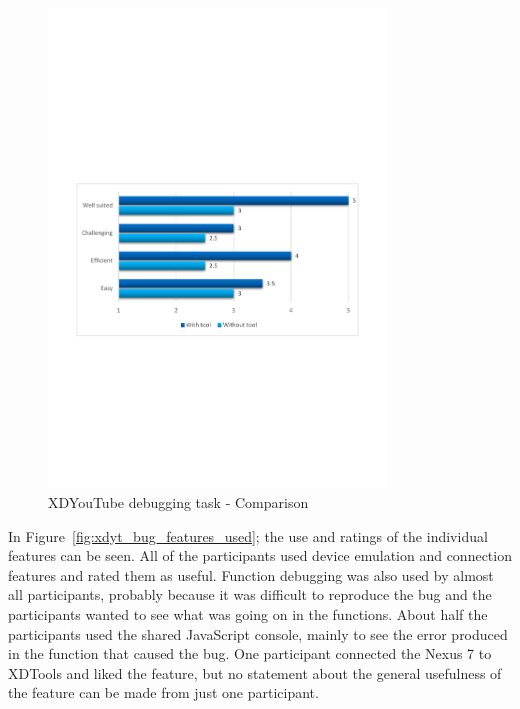 \begin{figure}[H]
  \centering
    \includegraphics[width=0.8\textwidth]{images/charts/xdyt_bug_comparison.pdf}
	\caption[xdyt-bug: Comparison]{XDYouTube debugging task - Comparison}
	\label{fig:xdyt_bug_comparison}
\end{figure}

In Figure~\ref{fig:xdyt_bug_features_used}; the use and ratings of the individual features can be seen. All of the participants used device emulation and connection features and rated them as useful. Function debugging was also used by almost all participants, probably because it was difficult to reproduce the bug and the participants wanted to see what was going on in the functions. About half the participants used the shared JavaScript console, mainly to see the error produced in the function that caused the bug. One participant connected the Nexus 7 to XDTools and liked the feature, but no statement about the general usefulness of the feature can be made from just one participant. 

